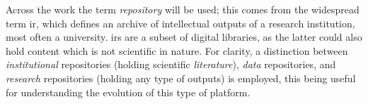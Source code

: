 Across the work the term \emph{repository} will be used; this comes from the widespread term \gls{ir}, which defines an archive of intellectual outputs of a research institution, most often a university. \glspl{ir} are a subset of digital libraries, as the latter could also hold content which is not scientific in nature. For clarity, a distinction between \emph{institutional} repositories (holding scientific \emph{literature}), \emph{data} repositories, and \emph{research} repositories (holding any type of outputs) is employed, this being useful for understanding the evolution of this type of platform.